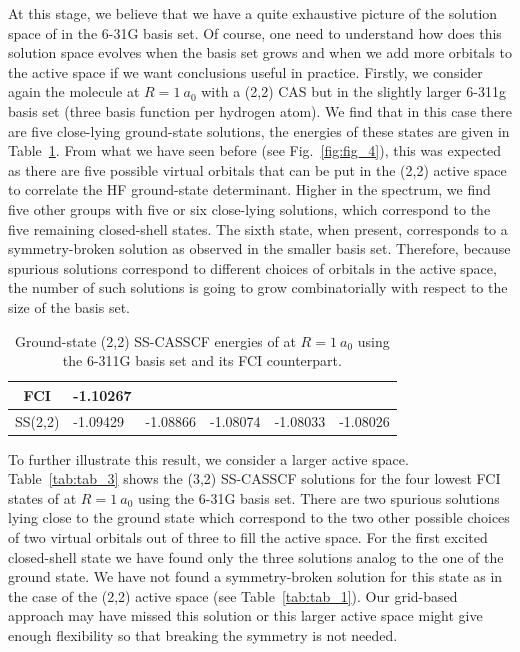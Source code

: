 \documentclass[aps,prb,reprint,showkeys,superscriptaddress]{revtex4-1}
\begin{document}
At this stage, we believe that we have a quite exhaustive picture of the solution space of  in the 6-31G basis set.
Of course, one need to understand how does this solution space evolves when the basis set grows and when we add more orbitals to the active space if we want conclusions useful in practice.
Firstly, we consider again the  molecule at $R=1~a_0$ with a (2,2) CAS but in the slightly larger 6-311g basis set (three basis function per hydrogen atom).
We find that in this case there are five close-lying ground-state solutions, the energies of these states are given in Table~\ref{tab:tab_2}.
From what we have seen before (see Fig.~\ref{fig:fig_4}), this was expected as there are five possible virtual orbitals that can be put in the (2,2) active space to correlate the HF ground-state determinant.
Higher in the spectrum, we find five other groups with five or six close-lying solutions, which correspond to the five remaining closed-shell states.
The sixth state, when present, corresponds to a symmetry-broken solution as observed in the smaller basis set.
Therefore, because spurious solutions correspond to different choices of orbitals in the active space, the number of such solutions is going to grow combinatorially with respect to the size of the basis set.

\begin{table}[h!]
  \caption{Ground-state (2,2) SS-CASSCF energies of  at $R=1~a_0$ using the 6-311G basis set and its FCI counterpart.}
  \begin{ruledtabular}
    \label{tab:tab_2}
    \begin{tabular}{clllll}
      FCI & -1.10267 & & & &\\
      \hline
      SS(2,2) & -1.09429 & -1.08866 & -1.08074 & -1.08033 & -1.08026
    \end{tabular}
  \end{ruledtabular}
\end{table}

To further illustrate this result, we consider a larger active space. Table~\ref{tab:tab_3} shows the (3,2) SS-CASSCF solutions for the four lowest FCI states of  at $R=1~a_0$ using the 6-31G basis set.
There are two spurious solutions lying close to the ground state which correspond to the two other possible choices of two virtual orbitals out of three to fill the active space.
For the first excited closed-shell state we have found only the three solutions analog to the one of the ground state.
We have not found a symmetry-broken solution for this state as in the case of the (2,2) active space (see Table~\ref{tab:tab_1}).
Our grid-based approach may have missed this solution or this larger active space might give enough flexibility so that breaking the symmetry is not needed.
\end{document}
